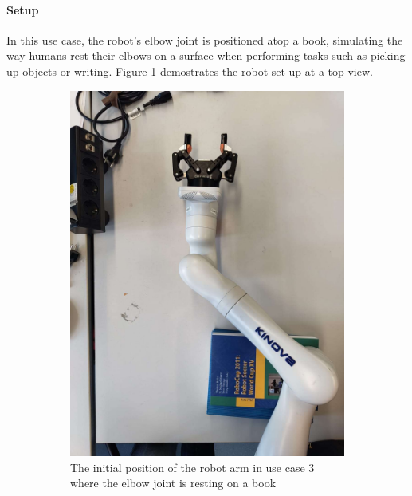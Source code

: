 \documentclass[report.tex]{subfiles}
\begin{document}
    \paragraph{\large{Setup}\\}
    In this use case, the robot's elbow joint is positioned atop a book, simulating the way humans rest their elbows on a surface when performing tasks such as picking up objects or writing. Figure \ref{fig:us3_init} demostrates the robot set up at a top view.
    \begin{figure}[H]
        \captionsetup[subfigure]{justification=centering}
        \begin{subfigure}{0.5\textwidth}
        \includegraphics[width=\linewidth]{images/us3_initial.jpg}
        \caption{The initial position of the robot arm in use case 3 where the elbow joint is resting on a book}
        \label{fig:us3_init}
    \end{subfigure}
        \begin{subfigure}{0.5\textwidth}

\end{subfigure}
\end{figure}
\end{document}
